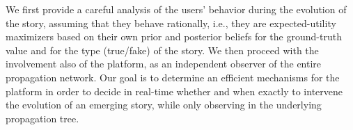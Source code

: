 We first provide a careful analysis of the users' behavior during the evolution of the story, assuming that they behave rationally, i.e., they are expected-utility maximizers based on their own prior and posterior beliefs for the ground-truth value and for the type (true/fake) of the story. We then proceed with the involvement also of the platform, as an independent observer of the entire propagation network. Our goal is to determine an efficient mechanisms for the platform in order to decide in real-time whether and when exactly to intervene the evolution of an emerging story, while only observing in the underlying propagation tree.  

\noindent 

\bigskip

